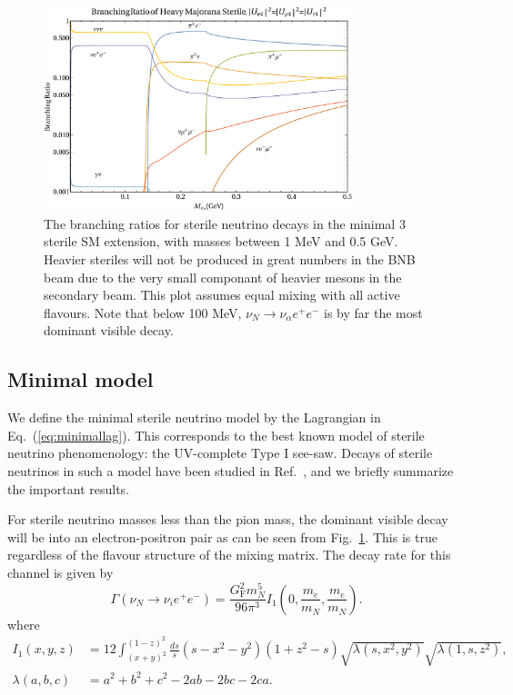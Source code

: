 \documentclass[11pt, a4paper]{article}
\newcommand{\refeq}[1]{Eq.~(\ref{#1})}
\newcommand{\reffig}[1]{Fig.~\ref{#1}}
\newcommand{\refref}[1]{Ref.~\cite{#1}}
\begin{document}
\begin{figure}[t]
%
\centering
%
\includegraphics[width=0.8\textwidth]{figures/bounds1.pdf}
%
%
\caption{\label{fig:branchingratios}The branching ratios for sterile neutrino
decays in the minimal 3 sterile SM extension, with masses between 1 MeV and 0.5
GeV. Heavier steriles will not be produced in great numbers in the BNB beam due
to the very small componant of heavier mesons in the secondary beam. This plot
assumes equal mixing with all active flavours. Note that below 100 MeV, $\nu_N
\rightarrow \nu_\alpha e^+ e^-$ is by far the most dominant visible decay.}
%
\end{figure}

\subsection{Minimal model}

We define the minimal sterile neutrino model by the Lagrangian in
\refeq{eq:minimallag}. This corresponds to the best known model of sterile
neutrino phenomenology: the UV-complete Type I see-saw. Decays of sterile
neutrinos in such a model have been studied in \refref{}, and we briefly
summarize the important results.

For sterile neutrino masses less than the pion mass, the dominant visible decay
will be into an electron-positron pair as can be seen from
\reffig{fig:branchingratios}. This is true regardless of the flavour structure
of the mixing matrix. The decay rate for this channel is given by 
%
\[ \Gamma\left(\nu_N\to \nu_i e^+e^-\right) =
\frac{G_\text{F}^2m_N^5}{96\pi^3}I_1\left(0,\frac{m_e}{m_N},\frac{ m_e}{m_N}\right).  \]
%
where 
\begin{align}
	I_1(x,y,z) & =12 \int_{(x+y)^2}^{(1-z)^2} \frac{ds}{s}(s-x^2-y^2)(1+z^2-s)\sqrt{\lambda(s,x^2,y^2)}\sqrt{\lambda(1,s,z^2)},\\
\lambda(a,b,c) &= a^2+b^2+c^2 - 2ab-2bc-2ca.
\end{align}
\end{document}
